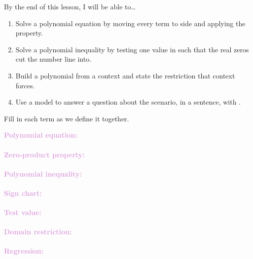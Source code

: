 \documentclass[10pt]{article}
\begin{document}

\vspace{0.12in}

\begin{objectivebox}
By the end of this lesson, I will be able to\ldots
\begin{enumerate}[itemsep=2pt]
  \item Solve a polynomial equation by moving every term to \blank{1.6cm}
        side and applying the \blank{3cm} property.
  \item Solve a polynomial inequality by testing one value in each
        \blank{1.8cm} that the real zeros cut the number line into.
  \item Build a polynomial \blank{1.6cm} from a context and state the
        \blank{2.2cm} restriction that context forces.
  \item Use a model to answer a question about the scenario, in a sentence,
        with \blank{1.6cm}.
\end{enumerate}
\end{objectivebox}

\vspace{0.1in}

\boxguard
\begin{vocabbox}
Fill in each term as we define it together.
\par\vspace{2pt}
\noindent\textbf{\textcolor{plum}{Polynomial equation:}}\\[1pt]
\writeline\\[3pt]
\noindent\textbf{\textcolor{plum}{Zero-product property:}}\\[1pt]
\writeline\\[3pt]
\noindent\textbf{\textcolor{plum}{Polynomial inequality:}}\\[1pt]
\writeline\\[3pt]
\noindent\textbf{\textcolor{plum}{Sign chart:}}\\[1pt]
\writeline\\[3pt]
\noindent\textbf{\textcolor{plum}{Test value:}}\\[1pt]
\writeline\\[3pt]
\noindent\textbf{\textcolor{plum}{Domain restriction:}}\\[1pt]
\writeline\\[3pt]
\noindent\textbf{\textcolor{plum}{Regression:}}\\[1pt]
\writeline
\end{vocabbox}
\end{document}
